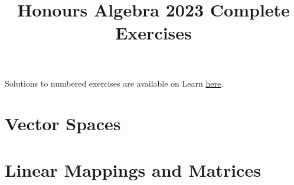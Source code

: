 \documentclass[a4paper]{article}
\title{Honours Algebra 2023 Complete Exercises}
\begin{document}
\maketitle

Solutions to numbered exercises are available on Learn \href{https://www.learn.ed.ac.uk/bbcswebdav/pid-8338476-dt-content-rid-33823325_1/xid-33823325_1}{here}.

\begin{enumerate}
  \section{Vector Spaces}
    
    
    
    
    
    

  \newpage
  \section{Linear Mappings and Matrices}
    
    
\end{enumerate}
\end{document}
